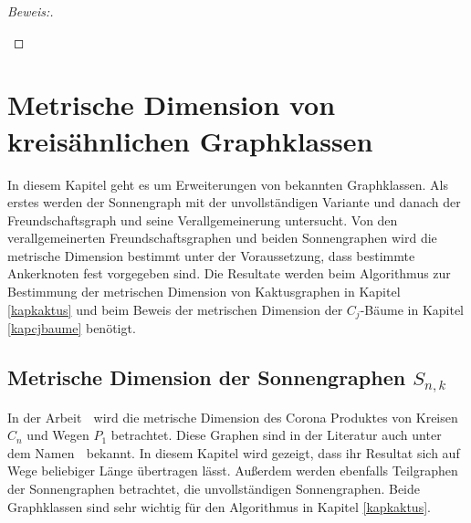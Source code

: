 \begin{proof}[Beweis:]
\begin{enumerate}
\begin{itemize}
\end{itemize}
\end{enumerate}
\end{proof}
\chapter{Metrische Dimension von kreisähnlichen Graphklassen}
\vspace{-5mm}
In diesem Kapitel geht es um Erweiterungen von bekannten Graphklassen. Als erstes werden der Sonnengraph mit der unvollständigen Variante und danach der Freundschaftsgraph und seine Verallgemeinerung untersucht.
Von den verallgemeinerten Freundschaftsgraphen und beiden Sonnengraphen wird die metrische Dimension bestimmt unter der Voraussetzung, dass bestimmte Ankerknoten fest vorgegeben sind. Die Resultate werden beim Algorithmus zur Bestimmung der metrischen Dimension von Kaktusgraphen in Kapitel \ref{kapkaktus} und beim Beweis der metrischen Dimension der $C_j$-Bäume in Kapitel \ref{kapcjbaume} benötigt.
\vspace{-6mm}
\section{Metrische Dimension der Sonnengraphen $S_{n,k}$}
\label{chap_sonne}
In der Arbeit \grqq$\;$\cite{bases} wird die metrische Dimension des Corona Produktes von Kreisen $C_n$ und Wegen $P_1$ betrachtet. Diese Graphen sind in der Literatur auch unter dem Namen \grqq$\;$\cite{sunwebsite} bekannt. In diesem Kapitel wird gezeigt, dass ihr Resultat sich auf Wege beliebiger Länge übertragen lässt. Außerdem werden ebenfalls Teilgraphen der Sonnengraphen betrachtet, die unvollständigen Sonnengraphen. Beide Graphklassen sind sehr wichtig für den Algorithmus in Kapitel \ref{kapkaktus}.

